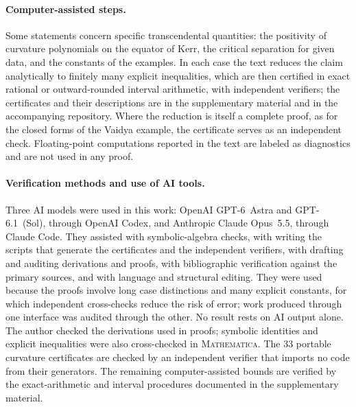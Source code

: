 \documentclass[aip,jmp,amsmath,amssymb,reprint]{revtex4-2}
\theoremstyle{plain}
\theoremstyle{definition}
\begin{document}
\paragraph{Computer-assisted steps.} Some statements concern specific transcendental quantities:
the positivity of curvature polynomials on the equator of Kerr, the critical separation for given
data, and the constants of the examples. In each case the text reduces the claim analytically to
finitely many explicit inequalities, which are then certified in exact rational or outward-rounded
interval arithmetic, with independent verifiers; the certificates and their descriptions are in the
supplementary material and in the accompanying repository. Where the reduction is itself a complete
proof, as for the closed forms of the Vaidya example, the certificate serves as an independent check.
Floating-point computations reported in the text are labeled as diagnostics and are not used in any
proof.

\paragraph{Verification methods and use of AI tools.} Three AI models were used in this work: OpenAI \mbox{GPT-6}~Astra and
\mbox{GPT-6.1}~(Sol), through OpenAI Codex, and Anthropic Claude Opus~5.5, through Claude Code. They assisted with symbolic-algebra checks,
with writing the scripts that generate the certificates and the independent verifiers, with drafting and
auditing derivations and proofs, with bibliographic verification against the primary sources, and with
language and structural editing. They were used because the proofs involve long case distinctions and
many explicit constants, for which independent cross-checks reduce the risk of error; work produced
through one interface was audited through the other. No result rests on AI output alone. The author checked the derivations used
in proofs; symbolic identities and explicit inequalities were also cross-checked in \textsc{Mathematica}. The
33 portable curvature certificates are checked by an independent verifier that imports no code from their
generators. The remaining computer-assisted bounds are verified by the exact-arithmetic and interval
procedures documented in the supplementary material.
\end{document}
